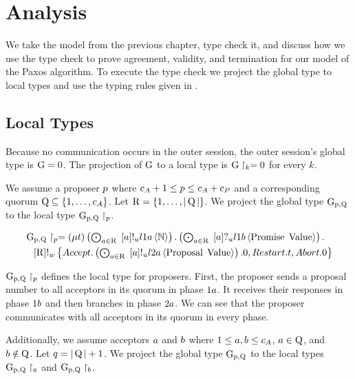 \chapter{Analysis}
We take the model from the previous chapter, type check it, and discuss how we use the type check to prove agreement, validity, and termination for our model of the Paxos algorithm.
To execute the type check we project the global type to local types and use the typing rules given in \cite{PetersEtal21}.

\section{Local Types}
Because no communication occurs in the outer session, the  outer session's global type is $\operatorname{G} = 0$.
The projection of $\operatorname{G}$ to a local type is $\operatorname{G} \upharpoonright_{k} = 0$ for every $k$.

We assume a proposer $p$ where $c_A + 1 \leq p \leq c_A + c_P$ and a corresponding quorum $\operatorname{Q}\subseteq\left\{1,\ldots,c_A\right\}$.
Let $\operatorname{R} = \left\{1,\ldots,|\operatorname{Q}|\right\}$.
We project the global type $\operatorname{G_{p, \operatorname{Q}}}$ to the local type $\operatorname{G_{p, \operatorname{Q}}} \upharpoonright_{p}$.

\begin{align*}
&\operatorname{G_{p, \operatorname{Q}}} \upharpoonright_{p} =
    \left(\mu t\right)
    \textstyle\left(\bigodot_{
        a\in\operatorname{R}
    }\;
        \left[a\right]!_u l1a \left\langle \mathbb{N} \right\rangle
    \right) .
    \textstyle\left(\bigodot_{
        a\in\operatorname{R}
    }\;
        \left[a\right]?_u l1b \left\langle \operatorname{Promise}\; \operatorname{Value} \right\rangle
    \right) .\\
&\hspace*{0.75em * 1}
    \left[\operatorname{R}\right]!_w \left\{
        \mathnormal{Accept} .
            \textstyle\left(\bigodot_{
                a\in\operatorname{R}
            }\;
                \left[a\right]!_u l2a \left\langle \operatorname{Proposal}\; \operatorname{Value} \right\rangle\right).
                0 ,
        \mathnormal{Restart} .
            t ,
        \mathnormal{Abort} .
            0
    \right\}
\end{align*}

$\operatorname{G_{p, \operatorname{Q}}} \upharpoonright_{p}$ defines the local type for proposers.
First, the proposer sends a proposal number to all acceptors in its quorum in phase $1a$.
It receives their responses in phase $1b$ and then branches in phase $2a$.
We can see that the proposer communicates with all acceptors in its quorum in every phase.

Additionally, we assume acceptors $a$ and $b$ where $1 \leq a, b \leq c_A$, $a\in\operatorname{Q}$, and $b\notin\operatorname{Q}$.
Let $q = |\operatorname{Q}| + 1$.
We project the global type $\operatorname{G_{p, \operatorname{Q}}}$ to the local types $\operatorname{G_{p, \operatorname{Q}}} \upharpoonright_{a}$ and $\operatorname{G_{p, \operatorname{Q}}} \upharpoonright_{b}$.

